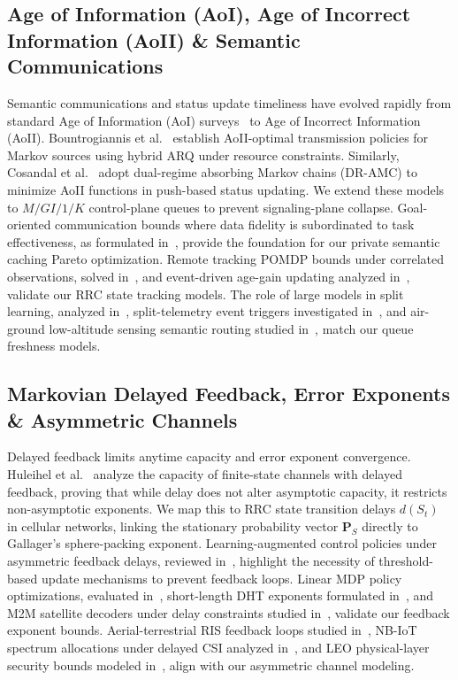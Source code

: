 \documentclass[journal]{IEEEtran}
\begin{document}
\subsection{Age of Information (AoI), Age of Incorrect Information (AoII) \& Semantic Communications}
Semantic communications and status update timeliness have evolved rapidly from standard Age of Information (AoI) surveys~\cite{yates_aoi} to Age of Incorrect Information (AoII). Bountrogiannis et al.~\cite{bountrogiannis_aoii} establish AoII-optimal transmission policies for Markov sources using hybrid ARQ under resource constraints. Similarly, Cosandal et al.~\cite{cosandal_aoii} adopt dual-regime absorbing Markov chains (DR-AMC) to minimize AoII functions in push-based status updating. We extend these models to $M/GI/1/K$ control-plane queues to prevent signaling-plane collapse. Goal-oriented communication bounds where data fidelity is subordinated to task effectiveness, as formulated in~\cite{goal_oriented}, provide the foundation for our private semantic caching Pareto optimization. Remote tracking POMDP bounds under correlated observations, solved in~\cite{correlated_remote}, and event-driven age-gain updating analyzed in~\cite{age_gain_random}, validate our RRC state tracking models. The role of large models in split learning, analyzed in~\cite{split_learning}, split-telemetry event triggers investigated in~\cite{split_learning}, and air-ground low-altitude sensing semantic routing studied in~\cite{low_altitude_sense}, match our queue freshness models.

\subsection{Markovian Delayed Feedback, Error Exponents \& Asymmetric Channels}
Delayed feedback limits anytime capacity and error exponent convergence. Huleihel et al.~\cite{huleihel_feedback} analyze the capacity of finite-state channels with delayed feedback, proving that while delay does not alter asymptotic capacity, it restricts non-asymptotic exponents. We map this to RRC state transition delays $d(S_t)$ in cellular networks, linking the stationary probability vector $\mathbf{P}_S$ directly to Gallager's sphere-packing exponent. Learning-augmented control policies under asymmetric feedback delays, reviewed in~\cite{ppo_6g}, highlight the necessity of threshold-based update mechanisms to prevent feedback loops. Linear MDP policy optimizations, evaluated in~\cite{pac_mdp}, short-length DHT exponents formulated in~\cite{dht_exponents}, and M2M satellite decoders under delay constraints studied in~\cite{m2m_satellite}, validate our feedback exponent bounds. Aerial-terrestrial RIS feedback loops studied in~\cite{ris_aerial}, NB-IoT spectrum allocations under delayed CSI analyzed in~\cite{ris_spectrum}, and LEO physical-layer security bounds modeled in~\cite{leo_security}, align with our asymmetric channel modeling.
\end{document}
